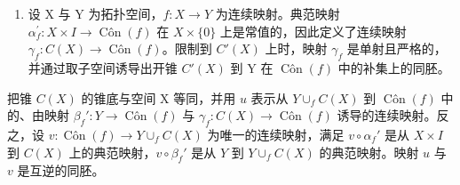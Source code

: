 \begin{enumerate}
\def\labelenumi{\arabic{enumi})}
\setcounter{enumi}{1}
\tightlist
\item
  设 X 与 Y 为拓扑空间，\(f\colon X \to Y\) 为连续映射。典范映射 \(\alpha_{f}^{\prime}\colon X \times I \to \operatorname{Côn}(f)\) 在 \(X \times \{0\}\) 上是常值的，因此定义了连续映射 \(\gamma_{f}\colon C(X) \to \operatorname{Côn}(f)\)。限制到 \(C'(X)\) 上时，映射 \(\gamma_{f}\) 是单射且严格的，并通过取子空间诱导出开锥 \(C'(X)\) 到 Y 在 \(\operatorname{Côn}(f)\) 中的补集上的同胚。
\end{enumerate}

把锥 \(C(X)\) 的锥底与空间 X 等同，并用 \(u\) 表示从 \(Y \cup_f C(X)\) 到 \(\operatorname{Côn}(f)\) 中的、由映射 \(\beta_f':Y\to\operatorname{Côn}(f)\) 与 \(\gamma_f:C(X)\to\operatorname{Côn}(f)\) 诱导的连续映射。反之，设 \(v:\operatorname{Côn}(f)\to Y\cup_f C(X)\) 为唯一的连续映射，满足 \(v\circ\alpha_f'\) 是从 \(X\times I\) 到 \(C(X)\) 上的典范映射，\(v\circ\beta_f'\) 是从 \(Y\) 到 \(Y\cup_f C(X)\) 的典范映射。映射 \(u\) 与 \(v\) 是互逆的同胚。

